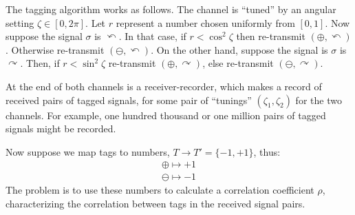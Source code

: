 \documentclass[9pt,technote]{IEEEtran}
\begin{document}
The tagging algorithm works as follows. The channel is ``tuned'' by an
angular setting $\zeta\in[0,2\pi]$. Let $r$ represent a number chosen
uniformly from $[0,1]$. Now suppose the signal $\sigma$ is
$\curvearrowleft$. In that case, if $r < \cos^2 \zeta$ then
re-transmit $(\oplus,\curvearrowleft)$. Otherwise re-transmit
$(\ominus,\curvearrowleft)$. On the other hand, suppose the signal
is $\sigma$ is $\curvearrowright$. Then, if $r < \sin^2 \zeta$
re-transmit $(\oplus,\curvearrowright)$, else re-transmit
$(\ominus,\curvearrowright)$.

At the end of both channels is a receiver-recorder, which makes a
record of received pairs of tagged signals, for some pair of
``tunings'' $(\zeta_1,\zeta_2)$ for the two channels. For example, one
hundred thousand or one million pairs of tagged signals might be
recorded.

Now suppose we map tags to numbers, $T\to T'=\{-1,+1\}$, thus:
\begin{align}
  \oplus \mapsto +1 \\
  \ominus \mapsto -1
\end{align}
The problem is to use these numbers to calculate a correlation
coefficient $\rho$, characterizing the correlation between tags in the
received signal pairs.
\end{document}
